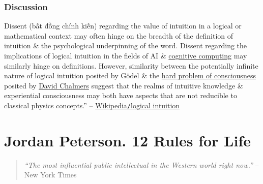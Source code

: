\documentclass{article}
\begin{document}
\subsubsection{Discussion}
Dissent (bất đồng chính kiến) regarding the value of intuition in a logical or mathematical context may often hinge on the breadth of the definition of intuition \& the psychological underpinning of the word. Dissent regarding the implications of logical intuition in the fields of AI \& \href{https://en.wikipedia.org/wiki/Cognitive_computing}{cognitive computing} may similarly hinge on definitions. However, similarity between the potentially infinite nature of logical intuition posited by G\"odel \& the \href{https://en.wikipedia.org/wiki/Hard_problem_of_consciousness}{hard problem of consciousness} posited by \href{https://en.wikipedia.org/wiki/David_Chalmers}{\sc David Chalmers} suggest that the realms of intuitive knowledge \& experiential consciousness may both have aspects that are not reducible to classical physics concepts.'' -- \href{https://en.wikipedia.org/wiki/Logical_intuition}{Wikipedia{\tt/}logical intuition}


\section{Jordan Peterson. 12 Rules for Life}

\begin{quotation}
	\textit{``The most influential public intellectual in the Western world right now.''} -- New York Times
\end{quotation}
\end{document}
